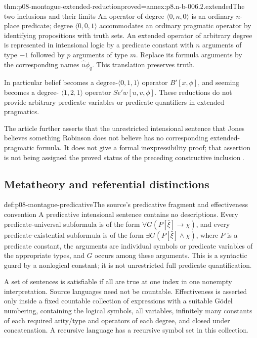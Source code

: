 \begin{hbtheorem}{thm:p08-montague-extended-reduction}{proved=annex:p8.n-b-006.2.extended}{The two inclusions and their limits}
An operator of degree \(\langle0,n,0\rangle\) is an ordinary
\(n\)-place predicate; degree \(\langle0,0,1\rangle\) accommodates
an ordinary pragmatic operator by identifying propositions with truth
sets. An extended operator of arbitrary degree is represented in
intensional logic by a predicate constant with \(n\) arguments of
type \(-1\) followed by \(p\) arguments of type \(m\). Replace its
formula arguments by the corresponding names
\(\widehat{\bar u}\phi_q\). This translation preserves truth.

In particular belief becomes a degree-\(\langle0,1,1\rangle\)
operator \(B'[x,\phi]\), and seeming becomes a degree-
\(\langle1,2,1\rangle\) operator
\(\mathit{Se}'w[u,v,\phi]\). These reductions do not provide arbitrary
predicate variables or predicate quantifiers in extended pragmatics.
\end{hbtheorem}

The article further asserts that the unrestricted intensional sentence
that Jones believes something Robinson does not believe has no
corresponding extended-pragmatic formula. It does not give a formal
inexpressibility proof; that assertion is not being assigned the proved
status of the preceding constructive inclusion
\cite[p.~88]{Montague1970Pragmatics}.

\subsection{Metatheory and referential distinctions}

\begin{hbdefinition}{def:p08-montague-predicative}{The source's predicative fragment and effectiveness convention}
A predicative intensional sentence contains no descriptions. Every
predicate-universal subformula is of the form
\(\forall G(P[\bar\xi]\to\chi)\), and every predicate-existential
subformula is of the form \(\exists G(P[\bar\xi]\land\chi)\), where
\(P\) is a predicate constant, the arguments are individual symbols
or predicate variables of the appropriate types, and \(G\) occurs
among these arguments. This is a syntactic guard by a nonlogical
constant; it is not unrestricted full predicate quantification.

A set of sentences is satisfiable if all are true at one index in one
nonempty interpretation. Source languages need not be countable.
Effectiveness is asserted only inside a fixed countable collection of
expressions with a suitable G\"odel numbering, containing the logical
symbols, all variables, infinitely many constants of each required
arity/type and operators of each degree, and closed under concatenation.
A recursive language has a recursive symbol set in this collection.
\end{hbdefinition}

